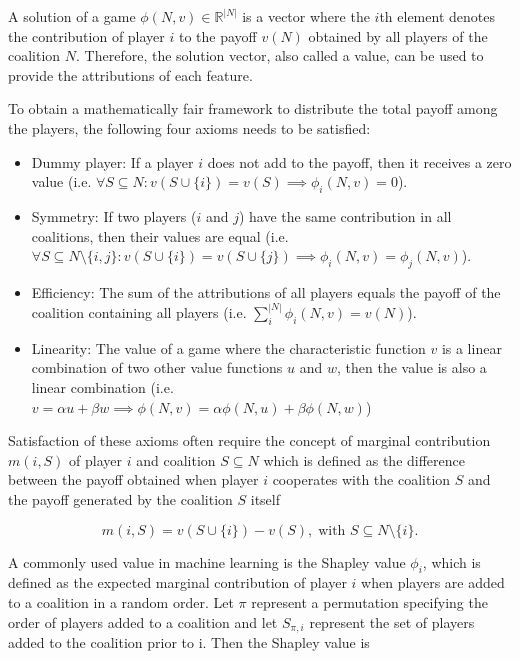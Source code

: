 A solution of a game $\phi(N, v) \in \mathbb{R}^{|N|}$ is a vector where the $i$th element
denotes the contribution of player $i$ to the payoff $v(N)$ obtained by all players
of the coalition $N$.\cite{zhang2022gstarx} Therefore, the solution vector,
also called a value, can be used to provide the attributions of each feature.


To obtain a mathematically fair framework to distribute the total payoff among 
the players, the following four axioms needs to be satisfied: \cite{merrick2020explanation, shapley1953value}


\begin{itemize}
	\item Dummy player: If a player $i$ does not add to the payoff, then it receives a
	      zero value (i.e. $\forall S \subseteq N: v(S \cup \{i\}) = v(S) \implies \phi_i(N, v) = 0$).

	\item Symmetry: If two players ($i$ and $j$) have the same contribution in all coalitions, then
	      their values are equal (i.e. $\forall S \subseteq N \setminus \{i, j\}: v(S \cup \{i\}) = v(S \cup \{j\}) \implies \phi_i(N, v) = \phi_j(N, v)$).

	\item Efficiency: The sum of the attributions of all players equals the payoff of the coalition containing
	      all players (i.e. $\sum^{|N|}_i \phi_i(N, v) = v(N)$).

	\item Linearity: The value of a game where the characteristic function $v$ is a linear combination of
	      two other value functions $u$ and $w$, then the value is also a linear combination (i.e.
	      $v = \alpha u + \beta w \implies \phi(N, v) = \alpha \phi(N, u) + \beta \phi(N, w)$)
\end{itemize}


Satisfaction of these axioms often require the concept of marginal contribution $m(i, S)$ 
of player $i$ and coalition $S \subseteq N$ which is defined as the 
difference between the payoff obtained when player $i$ cooperates with the coalition 
$S$ and the payoff generated by the coalition $S$ itself\cite{shapley1953value}


\begin{equation}
	m(i, S) = v\left(S \cup \{i\}\right) - v\left(S\right), \; \text{with } S \subseteq N \setminus \{i\}.
\end{equation}


A commonly used value in machine learning is the Shapley value
$\phi_i$, which is defined as the expected marginal 
contribution of player $i$ when players are added to a coalition in a 
random order. Let $\pi$ represent a permutation specifying the order 
of players added to a coalition and let $S_{\pi, i}$ represent the set of players 
added to the coalition prior to i. Then the Shapley value is\cite{merrick2020explanation} 


